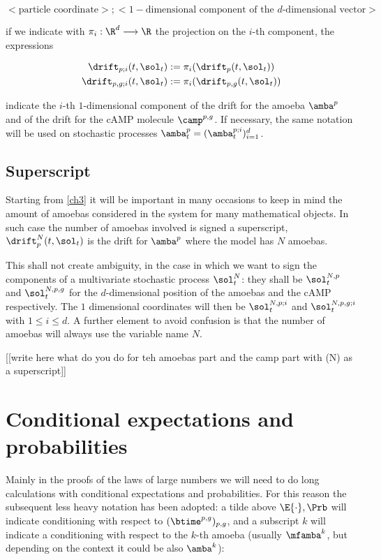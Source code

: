 \begin{equation*}
	<\text{particle coordinate}>; <1-\text{dimensional component of the $d$-dimensional vector}>
\end{equation*}

\ie if we indicate with $\pi_i: \R^d \longrightarrow \R$ the projection on the $i$-th component, the expressions

\begin{gather*}
	\drift_{p; i}(t, \sol_t) : = \pi_i ( \drift_{p}(t, \sol_t) )
	\\
	\drift_{p,g; i}(t, \sol_t) := \pi_i ( \drift_{p,g}(t, \sol_t) )
\end{gather*}

indicate the $i$-th $1$-dimensional component of the drift for the amoeba $\amba^p$ and of the drift for the cAMP molecule $\camp^{p,g}$.
If necessary, the same notation will be used on stochastic processes $\amba_t^{p} = ( \amba_t^{p;i} )_{i =1}^d$. 

\subsection{Superscript}

Starting from \ref{ch3} it will be important in many occasions to keep in mind the amount of amoebas considered in the system for many mathematical objects.
In such case the number of amoebas involved is signed a superscript, \eg $\drift_{p}^N(t, \sol_t)$ is the drift for $\amba^p$ where the model has $N$ amoebas.

This shall not create ambiguity, in the case in which we want to sign the components of a multivariate stochastic process $\sol_t^N$: they shall be $\sol_t^{N,p}$ and  $\sol_t^{N,p,g}$ for the $d$-dimensional position of the amoebas and the cAMP respectively. The $1$ dimensional coordinates will then be $\sol_t^{N,p;i}$ and  $\sol_t^{N,p,g;i}$ with $1 \leq i \leq d$.
A further element to avoid confusion is that the number of amoebas will always use the variable name $N$.

[[write here what do you do for teh amoebas part and the camp part with (N) as a superscript]]

\section{Conditional expectations and probabilities}

Mainly in the proofs of the laws of large numbers we will need to do long calculations with conditional expectations and probabilities.
For this reason the subsequent less heavy notation has been adopted: a tilde above $\E{\cdot}, \Prb$ will indicate conditioning with respect to $ (\btime^{p,g})_{p,g}$, and a subscript $k$ will indicate a conditioning with respect to the $k$-th amoeba (usually $\mfamba^k$, but depending on the context it could be also $\amba^k$):

